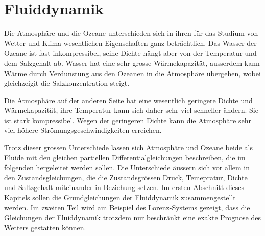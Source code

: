 %
%
%
\chapter{Fluiddynamik}
\rhead{}
Die Atmosphäre und die Ozeane unterschieden sich in ihren
für das Studium von Wetter und Klima wesentlichen Eigenschaften
ganz beträchtlich.
Das Wasser der Ozeane ist fast inkompressibel, seine Dichte hängt aber
von der Temperatur und dem Salzgehalt ab.
Wasser hat eine sehr grosse Wärmekapazität, ausserdem kann Wärme durch
Verdunstung aus den Ozeanen in die Atmosphäre übergehen, wobei gleichzeigit
die Salzkonzentration steigt.

Die Atmosphäre auf der anderen Seite hat eine wesentlich geringere
Dichte und Wärmekapazität, ihre Temperatur kann sich daher sehr viel
schneller ändern.
Sie ist stark kompressibel.
Wegen der geringeren Dichte kann die Atmosphäre sehr viel höhere
Strömungsgeschwindigkeiten erreichen.

Trotz dieser grossen Unterschiede lassen sich Atmosphäre und Ozeane
beide als Fluide mit den gleichen partiellen Differentialgleichungen
beschreiben, die im folgenden hergeleitet werden sollen.
Die Unterschiede äussern sich vor allem in den Zustandsgleichungen,
die die Zustandsgrössen Druck, Temepratur, Dichte und Saltzgehalt
miteinander in Beziehung setzen.
Im ersten Abschnitt dieses Kapitels sollen die Grundgleichungen
der Fluiddynamik zusammengestellt werden.
Im zweiten Teil wird am Beispiel des Lorenz-Systems gezeigt, dass
die Gleichungen der Fluiddynamik trotzdem nur beschränkt eine exakte
Prognose des Wetters gestatten können.









